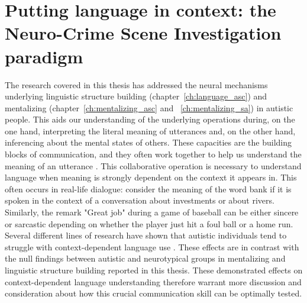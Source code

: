 \section{Putting language in context: the Neuro-Crime Scene Investigation paradigm}

The research covered in this thesis has addressed the neural mechanisms underlying linguistic structure building (chapter~\ref{ch:language_asc}) and mentalizing (chapter~\ref{ch:mentalizing_asc} and ~\ref{ch:mentalizing_sa}) in autistic people. This aids our understanding of the underlying operations during, on the one hand, interpreting the literal meaning of utterances and, on the other hand, inferencing about the mental states of others. These capacities are the building blocks of communication, and they often work together to help us understand the meaning of an utterance \citep{basnakova2014beyond,ferstl2008,Xu2005}. This collaborative operation is necessary to understand language when meaning is strongly dependent on the context it appears in. This often occurs in real-life dialogue: consider the meaning of the word bank if it is spoken in the context of a conversation about investments or about rivers. Similarly, the remark "Great job" during a game of baseball can be either sincere or sarcastic depending on whether the player just hit a foul ball or a home run. Several different lines of research have shown that autistic individuals tend to struggle with context-dependent language use \citep{angeleri2016,loukusa2007,wadge2019}. These effects are in contrast with the null findings between autistic and neurotypical groups in mentalizing and linguistic structure building reported in this thesis. These demonstrated effects on context-dependent language understanding therefore warrant more discussion and consideration about how this crucial communication skill can be optimally tested.


